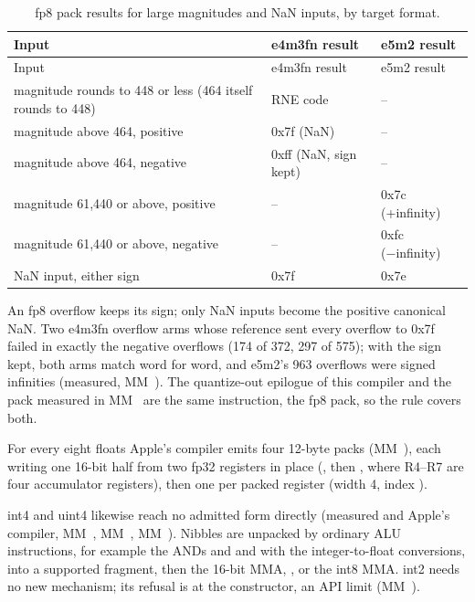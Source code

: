\begin{xltabular}{\linewidth}{@{}>{\hsize}X>{\hsize}X>{\hsize}X@{}}
\caption{fp8 pack results for large magnitudes and NaN inputs, by target format.}\label{tab:fp8-pack-limits}\\
\toprule
Input & e4m3fn result & e5m2 result \\
\midrule
\endfirsthead
{}
\toprule
Input & e4m3fn result & e5m2 result \\
\midrule
\endhead
magnitude rounds to 448 or less (464 itself rounds to 448) & RNE code & – \\*
magnitude above 464, positive & 0x7f (NaN) & – \\*
magnitude above 464, negative & 0xff (NaN, sign kept) & – \\*
magnitude 61,440 or above, positive & – & 0x7c (+infinity) \\*
magnitude 61,440 or above, negative & – & 0xfc (−infinity) \\*
NaN input, either sign & 0x7f & 0x7e \\*
\bottomrule
\end{xltabular}

An fp8 overflow keeps its sign; only NaN inputs become the positive canonical NaN. Two e4m3fn overflow arms whose
reference sent every overflow to 0x7f failed in exactly the negative overflows (174 of 372, 297 of 575); with the
sign kept, both arms match word for word, and e5m2's 963 overflows were signed infinities (measured, MM~). The
quantize-out epilogue of this compiler and the pack measured in MM~ are the same instruction, the fp8 pack, so the
rule covers both.

For every eight floats Apple's compiler emits four 12-byte  packs (MM~), each
writing one 16-bit half from two fp32 registers in place (, then , where R4–R7 are four
accumulator registers), then one  per packed register (width 4, index ).

int4 and uint4 likewise reach no admitted form directly (measured and Apple's compiler, MM~, MM~,
MM~). Nibbles
are unpacked by ordinary ALU instructions, for example the ANDs  and  and
 with the integer-to-float conversions, into a supported fragment, then the 16-bit MMA,
, or the int8 MMA. int2 needs no new mechanism; its refusal is at the
 constructor, an API limit (MM~).

